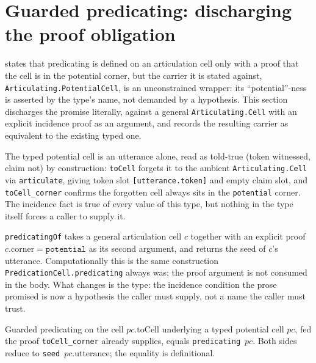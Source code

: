 \section{Guarded predicating: discharging the proof obligation}

 states that predicating is defined on an
articulation cell only with a proof that the cell is in the potential corner,
but the carrier it is stated against, \texttt{Articulating.PotentialCell}, is
an unconstrained wrapper: its ``potential''-ness is asserted by the type's
name, not demanded by a hypothesis. This section discharges the promise
literally, against a general \texttt{Articulating.Cell} with an explicit
incidence proof as an argument, and records the resulting carrier as
equivalent to the existing typed one.

\begin{proposition}\label{thm:potential-cell}\leanok{}
The typed potential cell is an utterance alone, read as told-true (token
witnessed, claim not) by construction: \texttt{toCell} forgets it to the
ambient \texttt{Articulating.Cell} via \texttt{articulate}, giving token slot
\texttt{[utterance.token]} and empty claim slot, and \texttt{toCell\_corner}
confirms the forgotten cell always sits in the \texttt{potential} corner. The
incidence fact is true of every value of this type, but nothing in the type
itself forces a caller to supply it.
\end{proposition}

\begin{proposition}\label{thm:predicating-guarded}\leanok{}
\texttt{predicatingOf} takes a general articulation cell \(c\) together with
an explicit proof \(c.\mathrm{corner} = \mathtt{potential}\) as its second
argument, and returns the seed of \(c\)'s utterance. Computationally this is
the same construction \texttt{PredicationCell.predicating} always was; the
proof argument is not consumed in the body. What changes is the type: the
incidence condition the prose promised is now a hypothesis the caller must
supply, not a name the caller must trust.
\end{proposition}

\begin{theorem}\label{thm:predicating-guarded-agree}\leanok{}
Guarded predicating on the cell \(pc.\mathrm{toCell}\) underlying a typed
potential cell \(pc\), fed the proof \texttt{toCell\_corner} already supplies,
equals \texttt{predicating}~\(pc\). Both sides reduce to
\texttt{seed}~\(pc.\mathrm{utterance}\); the equality is definitional.
\end{theorem}

